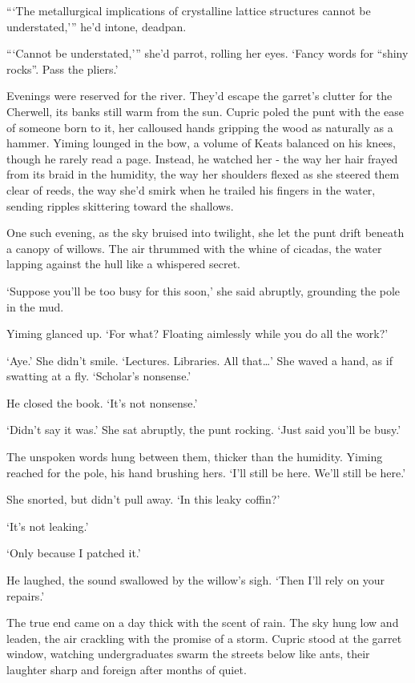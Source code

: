 ```The metallurgical implications of crystalline lattice structures cannot be understated,''' he'd intone, deadpan.

```Cannot be understated,''' she'd parrot, rolling her eyes. `Fancy words for ``shiny rocks''. Pass the pliers.'

Evenings were reserved for the river. They'd escape the garret's clutter for the Cherwell, its banks still warm from the sun. Cupric poled the punt with the ease of someone born to it, her calloused hands gripping the wood as naturally as a hammer. Yiming lounged in the bow, a volume of Keats balanced on his knees, though he rarely read a page. Instead, he watched her - the way her hair frayed from its braid in the humidity, the way her shoulders flexed as she steered them clear of reeds, the way she'd smirk when he trailed his fingers in the water, sending ripples skittering toward the shallows.

One such evening, as the sky bruised into twilight, she let the punt drift beneath a canopy of willows. The air thrummed with the whine of cicadas, the water lapping against the hull like a whispered secret.

`Suppose you'll be too busy for this soon,' she said abruptly, grounding the pole in the mud.

Yiming glanced up. `For what? Floating aimlessly while you do all the work?'

`Aye.' She didn't smile. `Lectures. Libraries. All that\dots' She waved a hand, as if swatting at a fly. `Scholar's nonsense.'

He closed the book. `It's not nonsense.'

`Didn't say it was.' She sat abruptly, the punt rocking. `Just said you'll be busy.'

The unspoken words hung between them, thicker than the humidity. Yiming reached for the pole, his hand brushing hers. `I'll still be here. We'll still be here.'

She snorted, but didn't pull away. `In this leaky coffin?'

`It's not leaking.'

`Only because I patched it.'

He laughed, the sound swallowed by the willow's sigh. `Then I'll rely on your repairs.'

The true end came on a day thick with the scent of rain. The sky hung low and leaden, the air crackling with the promise of a storm. Cupric stood at the garret window, watching undergraduates swarm the streets below like ants, their laughter sharp and foreign after months of quiet.

